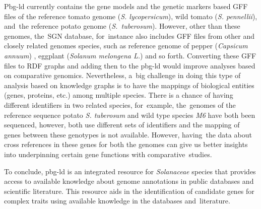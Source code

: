 \documentclass[applsci,article,accept,moreauthors,pdftex]{Definitions/mdpi}
\begin{document}
{Pbg-ld currently contains the gene models and the genetic markers based GFF files of the reference tomato genome (\textit{S. lycopersicum}), wild tomato  (\textit{S. pennellii}), and~the reference potato genome (\textit{S.~tuberosum}). However, other than these genomes, the~SGN database, for~instance also includes GFF files from other  %
and closely related genomes species, such as reference genome of pepper (\textit{Capsicum annuum}) \cite{hulse2018reference}, eggplant (\textit{Solanum melongena L.}) \cite{hirakawa2014draft} and so forth. Converting these GFF files to RDF graphs and adding then to the pbg-ld would improve analyses based on comparative genomics. Nevertheless, a~big challenge in doing this type of analysis based on knowledge graphs is to have the mappings of biological entities (genes, proteins, etc.) among multiple species. There is a chance of having different identifiers in two related species, for~example, the~genomes of the reference sequence potato \textit{S. tuberosum} and wild type species \textit{M6} have both been sequenced, however, both use different sets of identifiers and the mapping of genes between these genotypes is not available. However, having~the data about cross references in these genes for both the genomes can give us better insights into underpinning certain gene functions with comparative~studies. 

To conclude, pbg-ld is an integrated resource for \textit{Solanaceae} species that provides access to available knowledge about genome annotations in public databases and scientific literature. This resource aids in the identification of candidate genes for complex traits using available knowledge in the databases and~literature.







}
\end{document}
